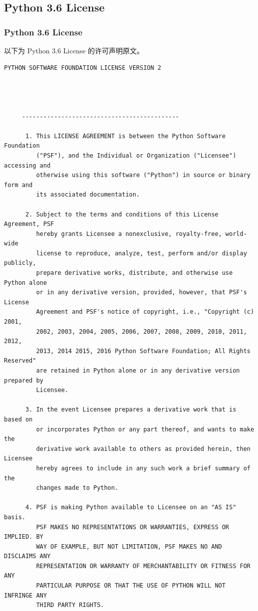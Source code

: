 \subsection{Python 3.6 License}
\subsubsection*{Python 3.6 License}

以下为 Python 3.6 License 的许可声明原文。

\begin{lstlisting}[basicstyle=\ttfamily\footnotesize,breaklines=true]
     PYTHON SOFTWARE FOUNDATION LICENSE VERSION 2




     --------------------------------------------

      1. This LICENSE AGREEMENT is between the Python Software Foundation
         ("PSF"), and the Individual or Organization ("Licensee") accessing and
         otherwise using this software ("Python") in source or binary form and
         its associated documentation.

      2. Subject to the terms and conditions of this License Agreement, PSF
         hereby grants Licensee a nonexclusive, royalty-free, world-wide
         license to reproduce, analyze, test, perform and/or display publicly,
         prepare derivative works, distribute, and otherwise use Python alone
         or in any derivative version, provided, however, that PSF's License
         Agreement and PSF's notice of copyright, i.e., "Copyright (c) 2001,
         2002, 2003, 2004, 2005, 2006, 2007, 2008, 2009, 2010, 2011, 2012,
         2013, 2014 2015, 2016 Python Software Foundation; All Rights Reserved"
         are retained in Python alone or in any derivative version prepared by
         Licensee.

      3. In the event Licensee prepares a derivative work that is based on
         or incorporates Python or any part thereof, and wants to make the
         derivative work available to others as provided herein, then Licensee
         hereby agrees to include in any such work a brief summary of the
         changes made to Python.

      4. PSF is making Python available to Licensee on an "AS IS" basis.
         PSF MAKES NO REPRESENTATIONS OR WARRANTIES, EXPRESS OR IMPLIED. BY
         WAY OF EXAMPLE, BUT NOT LIMITATION, PSF MAKES NO AND DISCLAIMS ANY
         REPRESENTATION OR WARRANTY OF MERCHANTABILITY OR FITNESS FOR ANY
         PARTICULAR PURPOSE OR THAT THE USE OF PYTHON WILL NOT INFRINGE ANY
         THIRD PARTY RIGHTS.


\end{lstlisting}
